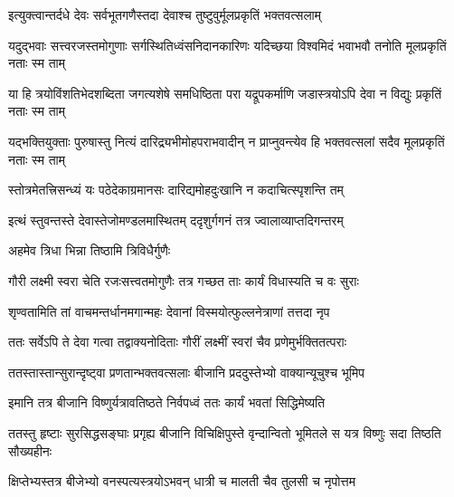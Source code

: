 \twolineshloka
{इत्युक्त्वान्तर्दधे देवः सर्वभूतगणैस्तदा}
{देवाश्च तुष्टुवुर्मूलप्रकृतिं भक्तवत्सलाम्} %


\fourlineindentedshloka
{यदुद्भवाः सत्त्वरजस्तमोगुणाः}
{सर्गस्थितिध्वंसनिदानकारिणः}
{यदिच्छया विश्वमिदं भवाभवौ}
{तनोति मूलप्रकृतिं नताः स्म ताम्} %

\twolineshloka
{या हि त्रयोविंशतिभेदशब्दिता जगत्यशेषे समधिष्ठिता परा}
{यद्रूपकर्माणि जडास्त्रयोऽपि देवा न विद्युः प्रकृतिं नताः स्म ताम्} %

\twolineshloka
{यद्भक्तियुक्ताः पुरुषास्तु नित्यं दारिद्र्यभीमोहपराभवादीन्}
{न प्राप्नुवन्त्येव हि भक्तवत्सलां सदैव मूलप्रकृतिं नताः स्म ताम्} %


\twolineshloka
{स्तोत्रमेतत्त्रिसन्ध्यं यः पठेदेकाग्रमानसः}
{दारिद्यमोहदुःखानि न कदाचित्स्पृशन्ति तम्} %

\twolineshloka
{इत्थं स्तुवन्तस्ते देवास्तेजोमण्डलमास्थितम्}
{ददृशुर्गगनं तत्र ज्वालाव्याप्तदिगन्तरम्} %




\onelineshloka
{अहमेव त्रिधा भिन्ना तिष्ठामि त्रिविधैर्गुणैः} %

\twolineshloka
{गौरी लक्ष्मी स्वरा चेति रजःसत्त्वतमोगुणैः}
{तत्र गच्छत ताः कार्यं विधास्यति च वः सुराः} %


\twolineshloka
{शृण्वतामिति तां वाचमन्तर्धानमगान्महः}
{देवानां विस्मयोत्फुल्लनेत्राणां तत्तदा नृप} %

\twolineshloka
{ततः सर्वेऽपि ते देवा गत्वा तद्वाक्यनोदिताः}
{गौरीं लक्ष्मीं स्वरां चैव प्रणेमुर्भक्तितत्पराः} %

\twolineshloka
{ततस्तास्तान्सुरान्दृष्ट्वा प्रणतान्भक्तवत्सलाः}
{बीजानि प्रददुस्तेभ्यो वाक्यान्यूचुश्च भूमिप} %


\twolineshloka
{इमानि तत्र बीजानि विष्णुर्यत्रावतिष्ठते}
{निर्वपध्वं ततः कार्यं भवतां सिद्धिमेष्यति} %

\fourlineindentedshloka
{ततस्तु हृष्टाः सुरसिद्धसङ्घाः}
{प्रगृह्य बीजानि विचिक्षिपुस्ते}
{वृन्दान्वितो भूमितले स यत्र}
{विष्णुः सदा तिष्ठति सौख्यहीनः} %





\twolineshloka
{क्षिप्तेभ्यस्तत्र बीजेभ्यो वनस्पत्यस्त्रयोऽभवन्}
{धात्री च मालती चैव तुलसी च नृपोत्तम} %

